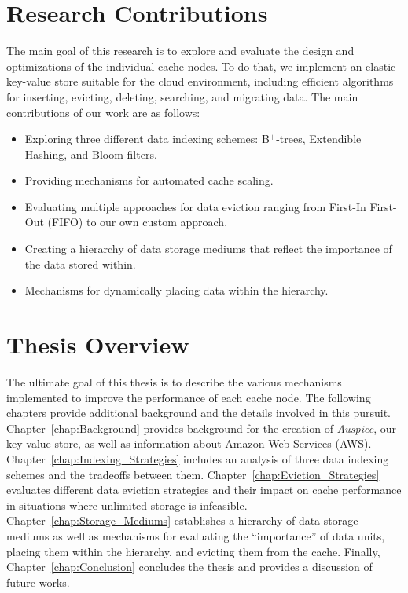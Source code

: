 \section{Research Contributions} %
\label{sec:Research_Contributions}
The main goal of this research is to explore and evaluate the design and
optimizations of the individual cache nodes. To do that, we implement an
elastic key-value store suitable for the cloud environment, including efficient
algorithms for inserting, evicting, deleting, searching, and migrating data.
The main contributions of our work are as follows:
\begin{itemize}
  \item Exploring three different data indexing schemes: B$^+$-trees, Extendible
    Hashing, and Bloom filters.
  \item Providing mechanisms for automated cache scaling.
  \item Evaluating multiple approaches for data eviction ranging from First-In
    First-Out (FIFO) to our own custom approach.
  \item Creating a hierarchy of data storage mediums that reflect the
    importance of the data stored within.
  \item Mechanisms for dynamically placing data within the hierarchy.
\end{itemize}


\section{Thesis Overview} %
\label{sec:Thesis_Overview}
The ultimate goal of this thesis is to describe the various mechanisms
implemented to improve the performance of each cache node. The following
chapters provide additional background and the details involved in this
pursuit. Chapter~\ref{chap:Background} provides background for the creation of
\emph{Auspice}, our key-value store, as well as information about Amazon Web
Services (AWS). Chapter~\ref{chap:Indexing_Strategies} includes an analysis of
three data indexing schemes and the tradeoffs between them.
Chapter~\ref{chap:Eviction_Strategies} evaluates different data eviction
strategies and their impact on cache performance in situations where unlimited
storage is infeasible. Chapter~\ref{chap:Storage_Mediums} establishes a
hierarchy of data storage mediums as well as mechanisms for evaluating the
``importance'' of data units, placing them within the hierarchy, and evicting
them from the cache. Finally, Chapter~\ref{chap:Conclusion} concludes the
thesis and provides a discussion of future works.

